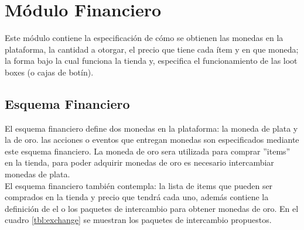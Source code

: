 \chapter{Módulo Financiero}
\label{mod:financiero}

    Este módulo contiene la especificación de %
    cómo se obtienen las monedas en la plataforma, la cantidad a otorgar, el precio que tiene cada ítem y en que moneda; la forma bajo la cual funciona la tienda y, especifica el funcionamiento de las loot boxes (o cajas de botín).

\section{Esquema Financiero}
    
    El esquema financiero define dos monedas en la plataforma: la moneda de plata y la de oro. las acciones o eventos que entregan monedas son especificados mediante este esquema financiero. La moneda de oro sera utilizada para comprar ''items''  en la tienda, para poder adquirir monedas de oro es necesario intercambiar monedas de plata.\\
    
    \noindent El esquema financiero también contempla: la lista de items que pueden ser comprados en la tienda y precio que tendrá cada uno, además contiene la definición de el o los paquetes de intercambio para obtener monedas de oro. En el cuadro \ref{tbl:exchange} se muestran los paquetes de intercambio propuestos.
    
    
    


